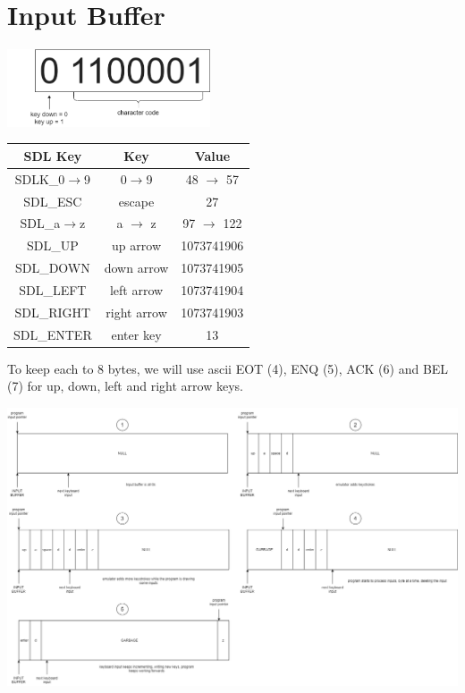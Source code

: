 \documentclass[11pt]{article}
\begin{document}
    \section*{Input Buffer}
        \begin{center}
            \includegraphics[width=6cm]{key input storage}
            \begin{tabular}{c c c}
                SDL Key & Key & Value \\
                \hline
                SDLK\_0$\to$9 & 0$\to$9 & 48 $\to$ 57 \\
                SDL\_ESC & escape & 27 \\
                SDL\_a$\to$z & a $\to$ z & 97 $\to$ 122 \\
                SDL\_UP & up arrow & 1073741906 \\
                SDL\_DOWN & down arrow & 1073741905 \\
                SDL\_LEFT & left arrow & 1073741904 \\
                SDL\_RIGHT & right arrow & 1073741903 \\
                SDL\_ENTER & enter key & 13 \\
            \end{tabular}
        \end{center}
        To keep each to 8 bytes, we will use ascii EOT (4), ENQ (5), ACK (6) and BEL (7) for up, down, left and right arrow keys.
        \begin{center}
            \includegraphics[width = \textwidth]{key input queue}
        \end{center}
\end{document}
